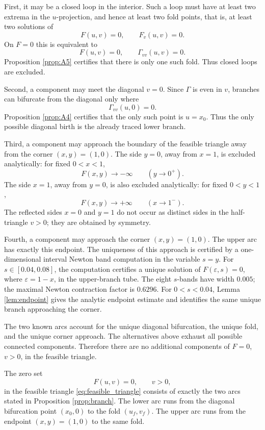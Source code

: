 First, it may be a closed loop in the interior.  Such a loop must have at
least two extrema in the \(u\)-projection, and hence at least two fold points,
that is, at least two solutions of
\[
  F(u,v)=0,
  \qquad
  F_v(u,v)=0.
\]
On \(F=0\) this is equivalent to
\[
  F(u,v)=0,
  \qquad
  \Gamma_{vv}(u,v)=0.
\]
Proposition \ref{prop:A5} certifies that there is only one such fold.  Thus
closed loops are excluded.

Second, a component may meet the diagonal \(v=0\).  Since \(\Gamma\) is even in
\(v\), branches can bifurcate from the diagonal only where
\[
  \Gamma_{vv}(u,0)=0.
\]
Proposition \ref{prop:A4} certifies that the only such point is \(u=x_0\).
Thus the only possible diagonal birth is the already traced lower branch.

Third, a component may approach the boundary of the feasible triangle away
from the corner \((x,y)=(1,0)\).  The side \(y=0\), away from \(x=1\), is
excluded analytically: for fixed \(0<x<1\),
\[
  F(x,y)\to -\infty
  \qquad (y\to0^+).
\]
The side \(x=1\), away from \(y=0\), is also excluded analytically: for fixed
\(0<y<1\),
\[
  F(x,y)\to +\infty
  \qquad (x\to1^-).
\]
The reflected sides \(x=0\) and \(y=1\) do not occur as distinct sides in the
half-triangle \(v>0\); they are obtained by symmetry.

Fourth, a component may approach the corner \((x,y)=(1,0)\).  The upper arc
has exactly this endpoint.  The uniqueness of this approach is certified by a
one-dimensional interval Newton band computation in the variable
\(s=y\).  For \(s\in[0.04,0.08]\), the computation certifies a unique solution
of \(F(\varepsilon,s)=0\), where \(\varepsilon=1-x\), in the upper-branch tube.
The eight \(s\)-bands have width \(0.005\); the maximal Newton contraction
factor is \(0.6296\).  For \(0<s<0.04\), Lemma \ref{lem:endpoint} gives the
analytic endpoint estimate and identifies the same unique branch approaching
the corner.

The two known arcs account for the unique diagonal bifurcation, the unique
fold, and the unique corner approach.  The alternatives above exhaust all
possible connected components.  Therefore there are no additional components
of \(F=0\), \(v>0\), in the feasible triangle.

\begin{proposition}\label{prop:A6}
The zero set
\[
  F(u,v)=0,
  \qquad
  v>0,
\]
in the feasible triangle \eqref{eq:feasible_triangle} consists of exactly the
two arcs stated in Proposition \ref{prop:branch}.  The lower arc runs from the
diagonal bifurcation point \((x_0,0)\) to the fold \((u_f,v_f)\).  The upper
arc runs from the endpoint \((x,y)=(1,0)\) to the same fold.
\end{proposition}


